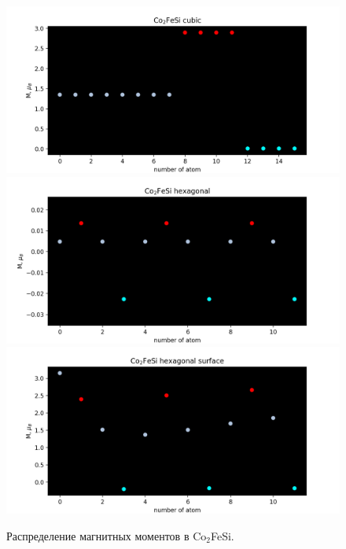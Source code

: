 \begin{figure}[h]
    \centering
    \includegraphics[scale=0.5]{images/co2fesi-cubic-100920_magn_3.png}
    \includegraphics[scale=0.5]{images/co2fesi-hex-100920_magn_3.png}
    \includegraphics[scale=0.5]{images/co2fesi-hex-surf-100920_magn_3.png}
    \caption{Распределение магнитных моментов в Co$_2$FeSi. }
    \label{fig:magn1}
\end{figure}

